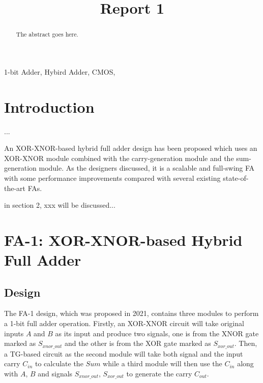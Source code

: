 \documentclass[conference]{IEEEtran}
\begin{document}
\title{Report 1}

\author{
}
\maketitle

\begin{abstract}
	The abstract goes here.
\end{abstract}

\begin{IEEEkeywords}
	1-bit Adder, Hybird Adder, CMOS,
\end{IEEEkeywords}

\section{Introduction}

...

An XOR-XNOR-based hybrid full adder design has been proposed\cite{20212210429416}
which uses an XOR-XNOR module combined with the carry-generation module and the sum-generation module.
As the designers discussed, it is a scalable and full-swing FA
with some performance improvements compared with several existing state-of-the-art FAs.

in section 2, xxx will be discussed...


\section{FA-1: XOR-XNOR-based Hybrid Full Adder}

\subsection{Design}

The FA-1\cite{20212210429416} design, which was proposed in 2021, contains three modules to perform a 1-bit full adder operation.
Firstly, an XOR-XNOR circuit will take original inputs \(A\) and \(B\) as its input and produce two signals,
one is from the XNOR gate marked as \(S_{xnor\_out}\) and the other is from the XOR gate marked as \( S_{xor\_out}\).
Then, a TG-based circuit as the second module will take both signal and the input carry \(C_{in}\) to calculate the \(Sum\)
while a third module will then use the \(C_{in}\) along with \(A\), \(B\) and signals \(S_{xnor\_out}\), \( S_{xor\_out}\) to generate the carry \(C_{out}\).
\end{document}
